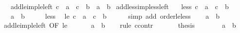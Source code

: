 \begin{isabellebody}
\ \ \ add{\isacharunderscore}{\kern0pt}le{\isacharunderscore}{\kern0pt}imp{\isacharunderscore}{\kern0pt}le{\isacharunderscore}{\kern0pt}left{\isacharcolon}{\kern0pt}\ {\isachardoublequoteopen}c\ {\isacharplus}{\kern0pt}\ a\ {\isasymle}\ c\ {\isacharplus}{\kern0pt}\ b\ {\isasymLongrightarrow}\ a\ {\isasymle}\ b{\isachardoublequoteclose}\isanewline
{}\isanewline
\isanewline
{}\isamarkupfalse%
\ add{\isacharunderscore}{\kern0pt}less{\isacharunderscore}{\kern0pt}imp{\isacharunderscore}{\kern0pt}less{\isacharunderscore}{\kern0pt}left{\isacharcolon}{\kern0pt}\isanewline
\ \ \ less{\isacharcolon}{\kern0pt}\ {\isachardoublequoteopen}c\ {\isacharplus}{\kern0pt}\ a\ {\isacharless}{\kern0pt}\ c\ {\isacharplus}{\kern0pt}\ b{\isachardoublequoteclose}\isanewline
\ \ \ {\isachardoublequoteopen}a\ {\isacharless}{\kern0pt}\ b{\isachardoublequoteclose}\isanewline
%
\isadelimproof
%
\endisadelimproof
%
\isatagproof
{}\isamarkupfalse%
\ {\isacharminus}{\kern0pt}\isanewline
\ \ \isamarkupfalse%
\ less\ \isamarkupfalse%
\ le{\isacharcolon}{\kern0pt}\ {\isachardoublequoteopen}c\ {\isacharplus}{\kern0pt}\ a\ {\isasymle}\ c\ {\isacharplus}{\kern0pt}\ b{\isachardoublequoteclose}\isanewline
\ \ \ \ \isamarkupfalse%
\ {\isacharparenleft}{\kern0pt}simp\ add{\isacharcolon}{\kern0pt}\ order{\isacharunderscore}{\kern0pt}le{\isacharunderscore}{\kern0pt}less{\isacharparenright}{\kern0pt}\isanewline
\ \ \isamarkupfalse%
\ {\isachardoublequoteopen}a\ {\isasymle}\ b{\isachardoublequoteclose}\isanewline
\ \ \ \ \isamarkupfalse%
\ add{\isacharunderscore}{\kern0pt}le{\isacharunderscore}{\kern0pt}imp{\isacharunderscore}{\kern0pt}le{\isacharunderscore}{\kern0pt}left\ {\isacharbrackleft}{\kern0pt}OF\ le{\isacharbrackright}{\kern0pt}\ \isacommand{{\isachardot}{\kern0pt}}\isamarkupfalse%
\isanewline
\ \ \isamarkupfalse%
\ \isamarkupfalse%
\ {\isachardoublequoteopen}a\ {\isasymnoteq}\ b{\isachardoublequoteclose}\isanewline
\ \ \isamarkupfalse%
\ {\isacharparenleft}{\kern0pt}rule\ ccontr{\isacharparenright}{\kern0pt}\isanewline
\ \ \ \ \isamarkupfalse%
\ {\isachardoublequoteopen}{\isasymnot}\ {\isacharquery}{\kern0pt}thesis{\isachardoublequoteclose}\isanewline
\ \ \ \ \isamarkupfalse%
\ \isamarkupfalse%
\ {\isachardoublequoteopen}a\ {\isacharequal}{\kern0pt}\ b{\isachardoublequoteclose}\ \isamarkupfalse%

\end{isabellebody}
